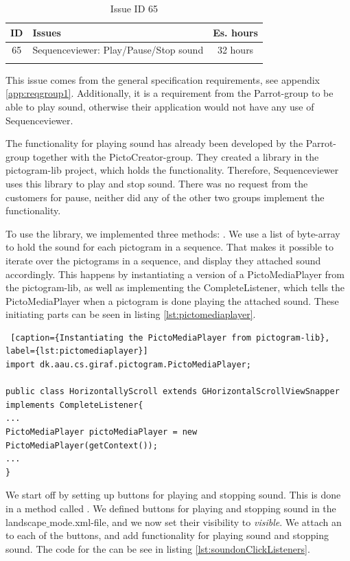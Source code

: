 \begin{longtable} { | c | p{12cm} | c | } 
\hline
	ID 	&	Issues	&		 Es. hours \\\hline
	 65	&	Sequenceviewer: Play/Pause/Stop sound	&	32 hours \\\hline
\caption{Issue ID 65}
\label{tab:spr4_SVplaypausestopsound}
\end{longtable}

This issue comes from the general specification requirements, see appendix \ref{app:reqgroup1}. Additionally, it is a requirement from the Parrot-group to be able to play sound, otherwise their application would not have any use of Sequenceviewer.

The functionality for playing sound has already been developed by the Parrot-group together with the PictoCreator-group. They created a library in the pictogram-lib project, which holds the functionality. Therefore, Sequenceviewer uses this library to play and stop sound. There was no request from the customers for pause, neither did any of the other two groups implement the functionality.

To use the library, we implemented three methods: . We use a list of byte-array to hold the sound for each pictogram in a sequence. That makes it possible to iterate over the pictograms in a sequence, and display they attached sound accordingly. This happens by instantiating a version of a PictoMediaPlayer from the pictogram-lib, as well as implementing the CompleteListener, which tells the PictoMediaPlayer when a pictogram is done playing the attached sound. These initiating parts can be seen in listing \ref{lst:pictomediaplayer}.

\begin{lstlisting} [caption={Instantiating the PictoMediaPlayer from pictogram-lib}, label={lst:pictomediaplayer}]
import dk.aau.cs.giraf.pictogram.PictoMediaPlayer;

public class HorizontallyScroll extends GHorizontalScrollViewSnapper implements CompleteListener{
...
PictoMediaPlayer pictoMediaPlayer = new PictoMediaPlayer(getContext());
...
}
\end{lstlisting}

We start off by setting up buttons for playing and stopping sound. This is done in a method called . We defined buttons for playing and stopping sound in the landscape$\_$mode.xml-file, and we now set their visibility to \textit{visible}. We attach an  to each of the buttons, and add functionality for playing sound and stopping sound. The code for the  can be see in listing \ref{lst:soundonClickListeners}.

